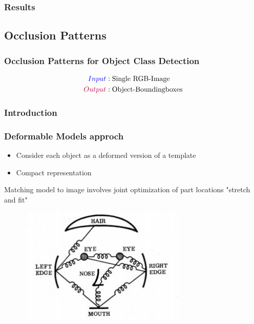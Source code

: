 \documentclass[xcolor=dvipsnames]{beamer}
\begin{document}
\subsubsection{Results}

\subsection{Occlusion Patterns}
{
\begin{frame}
	\frametitle{Occlusion Patterns for Object Class Detection}
	\Large

	\begin{align*}
		\textcolor{blue}{Input}&:  \text{Single RGB-Image} \\
		\textcolor{purple}{Output}&: \text{Object-Boundingboxes}
	\end{align*}
\end{frame}}

\subsubsection{Introduction}
\begin{frame}
	\frametitle{Deformable Models approch}
	\Large
	\begin{itemize}
		\item Consider each object as a deformed version of a template
		\item Compact representation
	\end{itemize}
\end{frame}

\begin{frame}
	\Large
	Matching model to image involves joint optimization of part locations "stretch and fit"
	\vspace{0.5cm}
	\begin{figure}
		\includegraphics[width=8.0cm]{img/pictorialStr.jpeg}
	\end{figure}
\end{frame}
\end{document}
